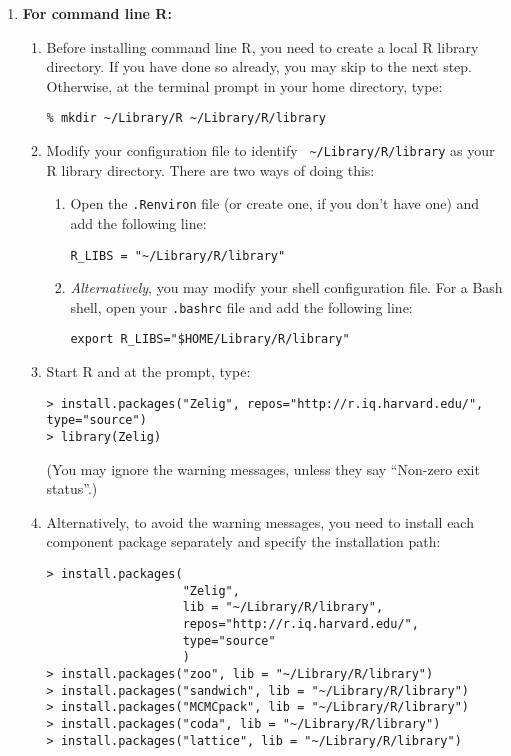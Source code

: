 \begin{enumerate}
\item {\bf For command line R:} 
  \begin{enumerate}
  \item Before installing command line R, you need to create a local R
    library directory.  If you have done so already, you may skip to
    the next step.  Otherwise, at the terminal prompt in your home
    directory, type:
\begin{verbatim}
% mkdir ~/Library/R ~/Library/R/library
\end{verbatim}
  \item Modify your configuration file to identify {\tt
      \~{}/Library/R/library} as your R library directory.  There are
    two ways of doing this:
    \begin{enumerate}
    \item Open the {\tt .Renviron} file (or create one, if you don't
      have one) and add the following line:
\begin{verbatim} 
R_LIBS = "~/Library/R/library"
\end{verbatim}
    \item {\it Alternatively}, you may modify your shell configuration
      file.  For a Bash shell, open your {\tt .bashrc} file and add
      the following line:
\begin{verbatim}
export R_LIBS="$HOME/Library/R/library"
\end{verbatim} %
      \end{enumerate}
    \item Start R and at the prompt, type:
\begin{verbatim}
> install.packages("Zelig", repos="http://r.iq.harvard.edu/", type="source")
> library(Zelig)
\end{verbatim}
(You may ignore the warning messages, unless they say ``Non-zero exit 
status''.)
\item Alternatively, to avoid the warning messages, you need to install 
each component package separately and specify the installation path:
\begin{verbatim}
> install.packages(
                   "Zelig",
                   lib = "~/Library/R/library",
                   repos="http://r.iq.harvard.edu/",
                   type="source"
                   )
> install.packages("zoo", lib = "~/Library/R/library")
> install.packages("sandwich", lib = "~/Library/R/library")
> install.packages("MCMCpack", lib = "~/Library/R/library")
> install.packages("coda", lib = "~/Library/R/library")
> install.packages("lattice", lib = "~/Library/R/library")

\end{verbatim}
\end{enumerate}
\end{enumerate}
